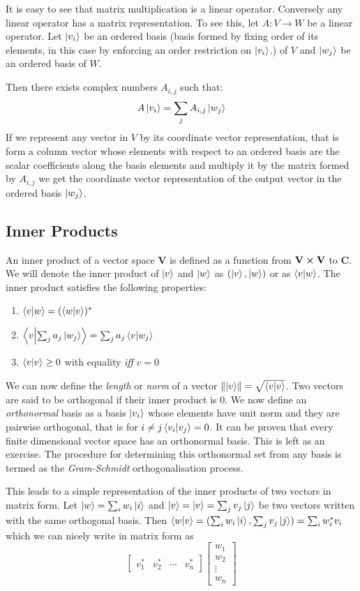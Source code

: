 It is easy to see that matrix multiplication is a linear operator. Conversely any linear operator has a matrix representation. To see this, let $A: V \to W$ be a linear operator. Let $\ket{v_{i}}$ be an ordered basis (basis formed by fixing order of its elements, in this case by enforcing an order restriction on $\ket{v_{i}}$.) of $V$ and $\ket{w_{j}}$ be an ordered basis of $W$.

Then there exists complex numbers $A_{i,j}$ such that: $$A\ket{v_{i}} = \sum_{j} A_{i,j}\ket{w_{j}}$$
If we represent any vector in $V$ by its coordinate vector representation, that is form a column vector whose elements with respect to an ordered basis are the scalar coefficients along the basis elements  and multiply it by the matrix formed by $A_{i,j}$ we get the coordinate vector representation of the output vector in the ordered basis $\ket{w_{j}}$.

\subsection{Inner Products}
An inner product of a vector space \textbf{V} is defined as a function from $\textbf{V} \cross \textbf{V}$ to $\textbf{C}$. We will denote the inner product of $\ket{v}$ and $\ket{w}$ as $(\ket{v}, \ket{w})$ or as $\braket{v}{w}$. The inner product satisfies the following properties:
\begin{enumerate}
    \item $\braket{v}{w} = ({\braket{w}{v}})^{*}$
    \item $\braket{v}{\sum_{j} a_{j} \ket{w_{j}}} = \sum_{j} a_{j} \braket{v}{w_{j}}$
    \item $\braket{v}{v} \geq 0 $ with equality \textit{iff} $v=0$
\end{enumerate}
We can now define the \textit{length} or \textit{norm} of a vector 
$\norm{\ket{v}} = \sqrt{\braket{v}{v}}$. 
Two vectors are said to be orthogonal if their inner product is $0$. 
We now define an \textit{orthonormal} basis as a basis $\ket{v_{i}}$ whose elements have unit norm and they are pairwise orthogonal, that is for $i\neq j \braket{v_i}{v_j} = 0$.
It can be proven that every finite dimensional vector space has an orthonormal basis. This is left as an exercise. The procedure for determining this orthonormal set from any basis is termed as the \textit{Gram-Schmidt} orthogonalisation process.


This leads to a simple representation of the inner products of two vectors in matrix form. Let $\ket{w} = \sum_i w_i \ket{i}$ and $\ket{v} = \ket{v} = \sum_j v_j \ket{j} $ be two vectors written with the same orthogonal basis.
Then $\braket{w}{v} = (\sum_i w_i \ket{i}, \sum_j v_j \ket{j}) = \sum_i w_{i}^*v_i  $ which we can nicely write in matrix form as
$$ \begin{bmatrix} v_1^* & v_2^* & \cdots & v_n^* \end{bmatrix} \begin{bmatrix} w_1 \\ w_2 \\ \vdots \\ w_n \end{bmatrix}$$

